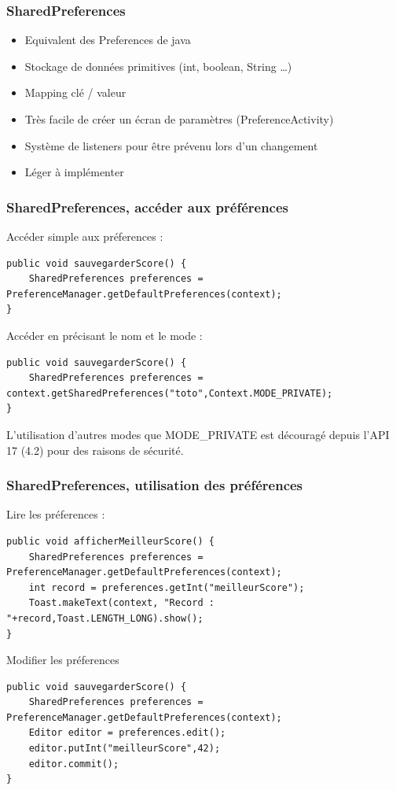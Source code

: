 \documentclass{beamer}
\begin{document}
\begin{frame}
\frametitle{SharedPreferences}
\begin{itemize}
    \item Equivalent des Preferences de java
    \item Stockage de données primitives (int, boolean, String \ldots)
    \item Mapping clé / valeur
    \item Très facile de créer un écran de paramètres (PreferenceActivity)
    \item Système de listeners pour être prévenu lors d'un changement
    \item Léger à implémenter
\end{itemize}
\end{frame}
\begin{frame}[fragile]
\frametitle{SharedPreferences, accéder aux préférences}
Accéder simple aux préferences :\\
\begin{lstlisting}
public void sauvegarderScore() {
    SharedPreferences preferences = PreferenceManager.getDefaultPreferences(context);
}
\end{lstlisting}
Accéder en précisant le nom et le mode :\\
\begin{lstlisting}
public void sauvegarderScore() {
    SharedPreferences preferences = context.getSharedPreferences("toto",Context.MODE_PRIVATE);
}
\end{lstlisting}
L'utilisation d'autres modes que MODE\_PRIVATE est découragé depuis l'API 17 (4.2) pour des raisons de sécurité.\\
\end{frame}
\begin{frame}[fragile]
\frametitle{SharedPreferences, utilisation des préférences}
Lire les préferences :\\
\begin{lstlisting}
public void afficherMeilleurScore() {
    SharedPreferences preferences = PreferenceManager.getDefaultPreferences(context);
    int record = preferences.getInt("meilleurScore");
    Toast.makeText(context, "Record : "+record,Toast.LENGTH_LONG).show();
}
\end{lstlisting}
Modifier les préferences\\
\begin{lstlisting}
public void sauvegarderScore() {
    SharedPreferences preferences = PreferenceManager.getDefaultPreferences(context);
    Editor editor = preferences.edit();
    editor.putInt("meilleurScore",42);
    editor.commit();
}
\end{lstlisting}
\end{frame}
\end{document}
